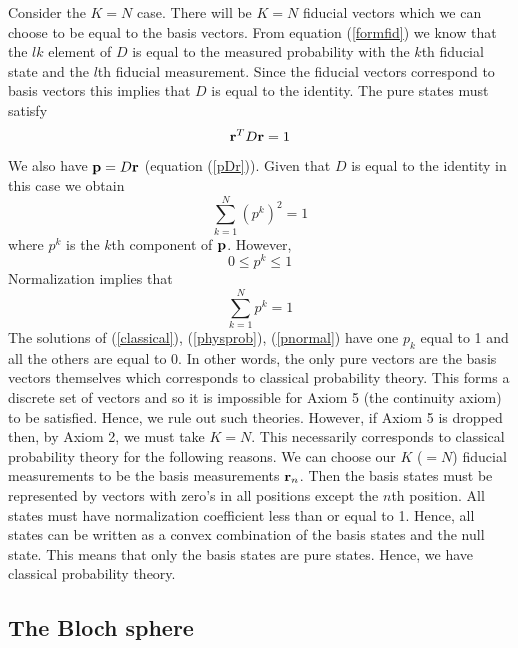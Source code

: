 \documentclass[12pt]{article}
\begin{document}
Consider the $K=N$ case.  There will be $K=N$ fiducial vectors
which we can choose to be equal to the basis vectors.  From equation
(\ref{formfid}) we know that the $lk$ element of
$D$ is equal to the measured probability with the $k$th fiducial state
and the $l$th fiducial measurement.  Since the fiducial vectors
correspond to basis vectors this implies that $D$ is equal to the
identity.  The pure states must
satisfy
\begin{equation}
{\bf r}^T D {\bf r} = 1
\end{equation}
We also have ${\bf p}=D{\bf r}$ (equation (\ref{pDr})).  Given that $D$
is equal to the identity in this case we obtain
\begin{equation}\label{classical}
\sum_{k=1}^N (p^k)^2=1
\end{equation}
where ${p^k}$ is the $k$th component of ${\bf p}$.  However,
\begin{equation}\label{physprob}
0\leq p^k \leq 1
\end{equation}
Normalization implies that
\begin{equation}\label{pnormal}
\sum_{k=1}^N p^k=1
\end{equation}
The solutions of (\ref{classical}), (\ref{physprob}),
(\ref{pnormal}) have one
$p_k$ equal to 1 and all the others are equal to 0.  In other words,
the only pure vectors are the basis vectors themselves which corresponds
to classical probability theory. This forms
a discrete set of vectors and so it is impossible for Axiom 5 (the continuity
axiom) to be satisfied.  Hence, we rule out such theories.  However, if
Axiom 5 is dropped then, by Axiom 2, we must take $K=N$.  This
necessarily corresponds to classical probability theory for the
following reasons.  We can choose our $K$ ($=N$) fiducial measurements
to be the basis measurements ${\bf r}_n$.  Then the basis states must be
represented by vectors with zero's in all positions except the $n$th
position.  All states must have normalization coefficient less than or
equal to 1.  Hence, all states can be written as a convex combination of
the basis states and the null state.  This means that only the basis
states are pure states.  Hence, we have classical probability theory.



\subsection{The Bloch sphere}\label{secbloch}
\end{document}
